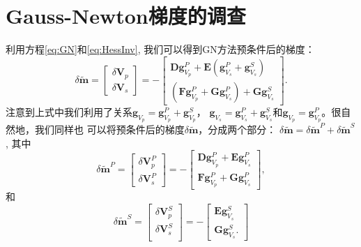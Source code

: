 \chapter{Gauss-Newton梯度的调查}
\label{cha:InvestigationOfGNGradient}
利用方程\eqref{eq:GN}和\eqref{eq:HessInv}, 我们可以得到GN方法预条件后的梯度：
\begin{equation}
        \delta \tilde{\mathbf{m}}=
        \begin{bmatrix}
                \delta \mathbf{V}_p\\
                \delta\mathbf{V}_s
        \end{bmatrix}
        =-
        \begin{bmatrix}
                \mathbf{D}\mathbf{g}^P_{V_p} +
                \mathbf{E}(\mathbf{g}^P_{V_s}+\mathbf{g}^S_{V_s})\\
                (\mathbf{F}\mathbf{g}^P_{V_p}+\mathbf{G}\mathbf{g}^P_{V_s}) +
                \mathbf{G}\mathbf{g}^S_{V_s}
        \end{bmatrix}.
        \label{eq:PreGN}
\end{equation}
注意到上式中我们利用了关系$\mathbf{g}_{V_p}=\mathbf{g}^P_{V_p}+\mathbf{g}^S_{V_p}$，
$\mathbf{g}_{V_s}=\mathbf{g}^P_{V_s}+\mathbf{g}^S_{V_s}$和$\mathbf{g}_{V_p}=\mathbf{g}^P_{V_p}$。很自然地，我们同样也
可以将预条件后的梯度$\delta\tilde{\mathbf{m}}$，分成两个部分：
$\delta \tilde{\mathbf{m}} = \delta \tilde{\mathbf{m}}^P+\delta
\tilde{\mathbf{m}}^S$, 其中
\begin{equation}
        \delta \tilde{\mathbf{m}}^P=
        \begin{bmatrix}
                \delta \mathbf{V}^P_p\\
                \delta \mathbf{V}^P_s
        \end{bmatrix}
        =-
        \begin{bmatrix}
                \mathbf{D}\mathbf{g}^P_{V_p} +
                \mathbf{E}\mathbf{g}^P_{V_s}\\
                \mathbf{F}\mathbf{g}^P_{V_p}+\mathbf{G}\mathbf{g}^P_{V_s}
        \end{bmatrix},
        \label{eq:PreGNP}
\end{equation}
和
\begin{equation}
        \delta \tilde{\mathbf{m}}^S=
        \begin{bmatrix}
                \delta \mathbf{V}^S_p\\
                \delta \mathbf{V}^S_s\\
        \end{bmatrix}
        =-
        \begin{bmatrix}
                \mathbf{E}\mathbf{g}^S_{V_s}\\
                \mathbf{G}\mathbf{g}^S_{V_s}.
        \end{bmatrix}
        \label{eq:PreGNS}
\end{equation}
